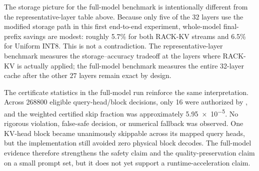 The storage picture for the full-model benchmark is intentionally different from the representative-layer table above. Because only five of the \(32\) layers use the modified storage path in this first end-to-end experiment, whole-model final-prefix savings are modest: roughly \num{5.7}\% for both RACK-KV streams and \num{6.5}\% for Uniform INT8. This is not a contradiction. The representative-layer benchmark measures the storage--accuracy tradeoff at the layers where RACK-KV is actually applied; the full-model benchmark measures the entire 32-layer cache after the other \(27\) layers remain exact by design.

The certificate statistics in the full-model run reinforce the same interpretation. Across \num{268800} eligible query-head/block decisions, only \num{16} were authorized by \mpfr{}, and the weighted certified skip fraction was approximately \num{5.95e-5}. No rigorous violation, false-safe decision, or numerical fallback was observed. One KV-head block became unanimously skippable across its mapped query heads, but the implementation still avoided zero physical block decodes. The full-model evidence therefore strengthens the safety claim and the quality-preservation claim on a small prompt set, but it does not yet support a runtime-acceleration claim.
